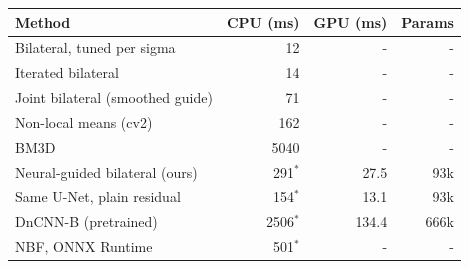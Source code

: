 \begin{tabular}{lrrr}
\toprule
Method & CPU (ms) & GPU (ms) & Params \\
\midrule
Bilateral, tuned per sigma & 12 & - & - \\
Iterated bilateral & 14 & - & - \\
Joint bilateral (smoothed guide) & 71 & - & - \\
Non-local means (cv2) & 162 & - & - \\
BM3D & 5040 & - & - \\
Neural-guided bilateral (ours) & 291$^*$ & 27.5 & 93k \\
Same U-Net, plain residual & 154$^*$ & 13.1 & 93k \\
DnCNN-B (pretrained) & 2506$^*$ & 134.4 & 666k \\
NBF, ONNX Runtime & 501$^*$ & - & - \\
\bottomrule
\end{tabular}
